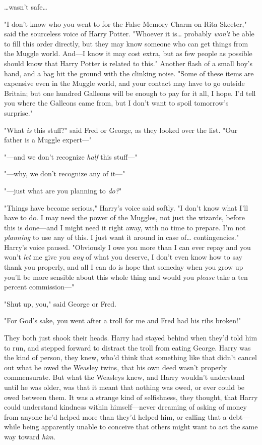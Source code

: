 {\ldots}wasn't safe{\ldots}

"I don't know who you went to for the False Memory Charm on Rita Skeeter," said 
the sourceless voice of Harry Potter. "Whoever it is{\ldots} probably 
\emph{won't} be able to fill this order directly, but they may know someone who 
can get things from the Muggle world. And---I know it may cost extra, but as 
few people as possible should know that Harry Potter is related to this." 
Another flash of a small boy's hand, and a bag hit the ground with the clinking 
noise. "Some of these items are expensive even in the Muggle world, and your 
contact may have to go outside Britain; but one hundred Galleons will be enough 
to pay for it all, I hope. I'd tell you where the Galleons came from, but I 
don't want to spoil tomorrow's surprise."

"What \emph{is} this stuff?" said Fred or George, as they looked over the list. 
"Our father is a Muggle expert---"

"---and we don't recognize \emph{half} this stuff---"

"---why, we don't recognize any of it---"

"---just what are you planning to \emph{do?}"

"Things have become serious," Harry's voice said softly. "I don't know what 
I'll have to do. I may need the power of the Muggles, not just the wizards, 
before this is done---and I might need it right away, with no time to prepare. 
I'm not \emph{planning} to use any of this. I just want it around in case 
of{\ldots} contingencies." Harry's voice paused. "Obviously I owe you more than 
I can ever repay and you won't \emph{let} me give you \emph{any} of what you 
deserve, I don't even know how to say thank you properly, and all I can do is 
hope that someday when you grow up you'll be more sensible about this whole 
thing and would you \emph{please} take a ten percent commission---"

"Shut up, you," said George or Fred.

"For God's sake, you went after a troll for me and Fred had his ribs broken!"

They both just shook their heads. Harry had stayed behind when they'd told him 
to run, and stepped forward to distract the troll from eating George. Harry was 
the kind of person, they knew, who'd think that something like that didn't 
cancel out what he owed the Weasley twins, that his own deed wasn't properly 
commensurate. But what the Weasleys knew, and Harry wouldn't understand until 
he was older, was that it meant that nothing was owed, or ever could be owed 
between them. It was a strange kind of selfishness, they thought, that Harry 
could understand kindness within himself---never dreaming of asking of money 
from anyone he'd helped more than they'd helped him, or calling that a 
debt---while being apparently unable to conceive that others might want to act 
the same way toward \emph{him}.

